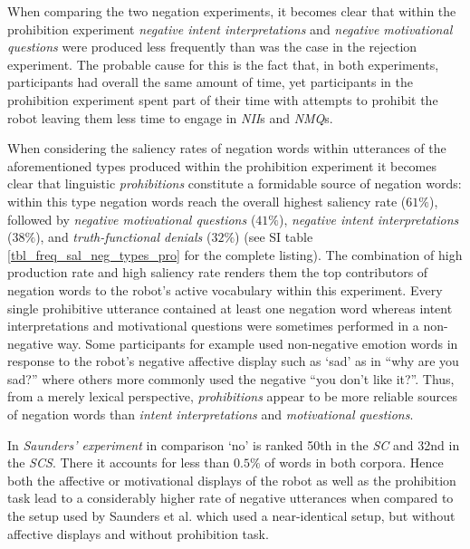 When comparing the two negation experiments, it becomes clear that within the prohibition experiment \emph{negative intent interpretations} and
\emph{negative motivational questions} were produced less frequently than was the case in the rejection experiment. The probable cause for this is the fact that,
in both experiments, participants had overall the same amount of time, yet participants in the prohibition experiment spent part of their time with attempts to prohibit
the robot leaving them less time to engage in \emph{NII}s and \emph{NMQ}s.


When considering the saliency rates of negation words within utterances of the aforementioned types produced within the prohibition experiment it becomes
clear that linguistic \emph{prohibitions} constitute a formidable source of negation words: within this type negation words reach the overall highest saliency rate
($61\%$), followed by \emph{negative motivational questions} ($41\%$), \emph{negative intent interpretations} ($38\%$), and
\emph{truth-functional denials} ($32\%$) (see SI table \ref{tbl_freq_sal_neg_types_pro} for the complete listing).
The combination of high production rate and high saliency rate renders them the top contributors of negation words to the robot's active vocabulary within
this experiment. Every single prohibitive utterance contained at least one negation word whereas intent interpretations and motivational questions  were sometimes
performed in a non-negative way. Some participants for example used non-negative emotion words in response to the robot's negative affective display such as `sad'
as in ``why are you sad?'' where others more commonly used the negative ``you don't like it?''. Thus, from a merely lexical perspective, \emph{prohibitions} appear to be
more reliable sources of negation words than \emph{intent interpretations} and \emph{motivational questions}.

In \emph{Saunders' experiment} in comparison `no'  is ranked 50th in the \emph{SC} and 32nd in the \emph{SCS}. There it accounts for less than $0.5\%$ of words in both
corpora. Hence both the affective or motivational displays of the robot as well as the prohibition task lead to a considerably higher rate of negative utterances when
compared to the setup used by Saunders et al. which used a near-identical setup, but without affective displays and without prohibition task.

